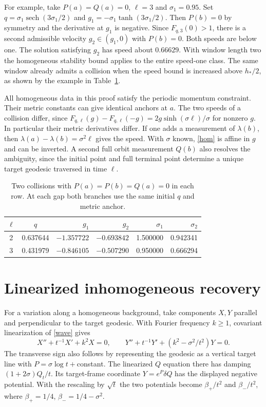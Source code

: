 \documentclass[11pt]{article}
\newcommand{\sech}{\operatorname{sech}}
\begin{document}
For example, take $P(a)=Q(a)=0$, $\ell=3$ and
$\sigma_1=0.95$. Set $q=\sigma_1\sech(3\sigma_1/2)$
and $g_1=-\sigma_1\tanh(3\sigma_1/2)$.
Then $P(b)=0$ by symmetry and the derivative at $g_1$ is negative.
Since $F_{q,3}(0)>1$, there is a second admissible velocity
$g_2\in(g_1,0)$ with $P(b)=0$.
Both speeds are below one. The solution satisfying $g_2$ has
speed about $0.66629$. With window length two the homogeneous
stability bound applies to the entire speed-one class.
The same window already admits a collision when the speed
bound is increased above $h_*/2$, as shown by the example in
Table~\ref{tab:collisions}.

All homogeneous data in this proof satisfy the periodic momentum
constraint. Their metric constants can give identical anchors at $a$.
The two speeds of a collision differ, since
$F_{q,\ell}(g)-F_{q,\ell}(-g)=2g\sinh(\sigma\ell)/\sigma$
for nonzero $g$. In particular their metric derivatives differ.
If one adds a measurement of $\lambda(b)$, then
$\lambda(a)-\lambda(b)=\sigma^2\ell$ gives the speed.
With $\sigma$ known, \eqref{hom} is affine in $g$ and can be inverted.
A second full orbit measurement $Q(b)$ also resolves the ambiguity,
since the initial point and full terminal point determine a unique
target geodesic traversed in time $\ell$.

\begin{table}[ht]
\centering
\begin{tabular}{ccrrrr}
\toprule
$\ell$ & $q$ & $g_1$ & $g_2$ & $\sigma_1$ & $\sigma_2$\\
\midrule
2 & 0.637644 & $-1.357722$ & $-0.693842$ & 1.500000 & 0.942341\\
3 & 0.431979 & $-0.846105$ & $-0.507290$ & 0.950000 & 0.666294\\
\bottomrule
\end{tabular}
\caption{Two collisions with $P(a)=P(b)=Q(a)=0$ in each row.
At each gap both branches use the same initial $q$ and metric anchor.}
\label{tab:collisions}
\end{table}




\section{Linearized inhomogeneous recovery}
For a variation along a homogeneous background, take components
$X,Y$ parallel and perpendicular to the target geodesic.
With Fourier frequency $k\ge1$, covariant linearization of
\eqref{wave} gives
\[
 X''+t^{-1}X'+k^2 X=0,\qquad
 Y''+t^{-1}Y'+(k^2-\sigma^2/t^2)Y=0.
\]
The transverse sign also follows by representing the geodesic
as a vertical target line with $P=\sigma\log t+$constant.
The linearized $Q$ equation there has damping $(1+2\sigma)Q_t/t$.
Its target-frame coordinate $Y=e^P\delta Q$ has the displayed
negative potential. With the rescaling by $\sqrt t$ the two
potentials become $\beta_+/t^2$ and $\beta_-/t^2$, where
$\beta_+=1/4$, $\beta_-=1/4-\sigma^2$.
\end{document}
